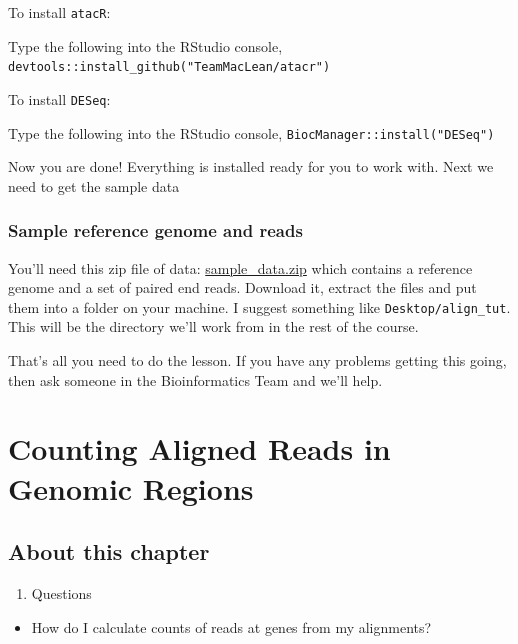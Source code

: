 \documentclass[]{book}
\providecommand{\tightlist}{%
  \setlength{\itemsep}{0pt}\setlength{\parskip}{0pt}}
\begin{document}
To install \texttt{atacR}:

Type the following into the RStudio console, \texttt{devtools::install\_github("TeamMacLean/atacr")}

To install \texttt{DESeq}:

Type the following into the RStudio console, \texttt{BiocManager::install("DESeq")}

Now you are done! Everything is installed ready for you to work with. Next we need to get the sample data

\hypertarget{sample-reference-genome-and-reads}{%
\subsection{Sample reference genome and reads}\label{sample-reference-genome-and-reads}}

You'll need this zip file of data: \href{https://github.com/TeamMacLean/basic_alignment/raw/master/sample_data/sample_data.zip}{sample\_data.zip} which contains a reference genome and a set of paired end reads. Download it, extract the files and put them into a folder on your machine. I suggest something like \texttt{Desktop/align\_tut}. This will be the directory we'll work from in the rest of the course.

That's all you need to do the lesson. If you have any problems getting this going, then ask someone in the Bioinformatics Team and we'll help.

\hypertarget{intro}{%
\chapter{Counting Aligned Reads in Genomic Regions}\label{intro}}

\hypertarget{about-this-chapter}{%
\section{About this chapter}\label{about-this-chapter}}

\begin{enumerate}
\def\labelenumi{\arabic{enumi}.}
\tightlist
\item
  Questions
\end{enumerate}

\begin{itemize}
\tightlist
\item
  How do I calculate counts of reads at genes from my alignments?
\end{itemize}
\end{document}
